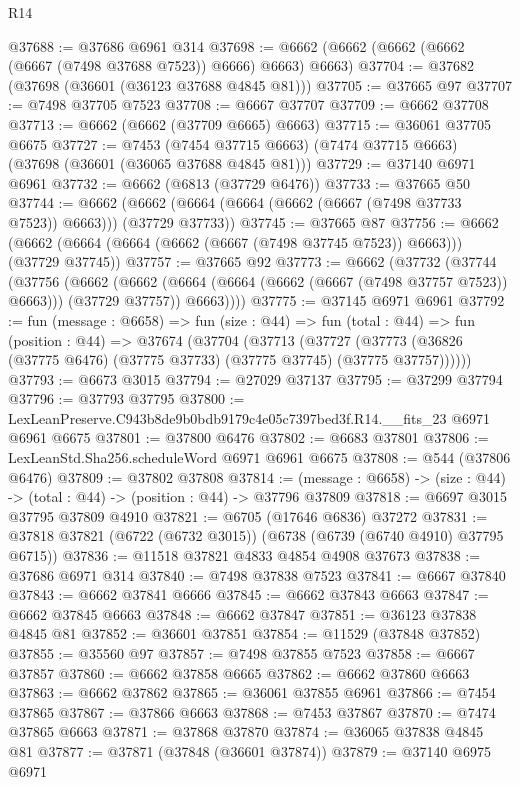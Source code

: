 \begin{lexlean}{R14}
\begin{coremodule}
@37688 := @37686 @6961 @314
@37698 := @6662 (@6662 (@6662 (@6662 (@6667 (@7498 @37688 @7523)) @6666) @6663) @6663)
@37704 := @37682 (@37698 (@36601 (@36123 @37688 @4845 @81)))
@37705 := @37665 @97
@37707 := @7498 @37705 @7523
@37708 := @6667 @37707
@37709 := @6662 @37708
@37713 := @6662 (@6662 (@37709 @6665) @6663)
@37715 := @36061 @37705 @6675
@37727 := @7453
    (@7454 @37715 @6663)
    (@7474 @37715 @6663)
    (@37698 (@36601 (@36065 @37688 @4845 @81)))
@37729 := @37140 @6971 @6961
@37732 := @6662 (@6813 (@37729 @6476))
@37733 := @37665 @50
@37744 := @6662 (@6662 (@6664 (@6664 (@6662 (@6667 (@7498 @37733 @7523)) @6663))) (@37729 @37733))
@37745 := @37665 @87
@37756 := @6662 (@6662 (@6664 (@6664 (@6662 (@6667 (@7498 @37745 @7523)) @6663))) (@37729 @37745))
@37757 := @37665 @92
@37773 := @6662
    (@37732
      (@37744
        (@37756
          (@6662
            (@6662 (@6664 (@6664 (@6662 (@6667 (@7498 @37757 @7523)) @6663))) (@37729 @37757))
            @6663))))
@37775 := @37145 @6971 @6961
@37792 := fun (message : @6658) =>
  fun (size : @44) =>
  fun (total : @44) =>
  fun (position : @44) =>
  @37674
    (@37704
      (@37713
        (@37727 (@37773 (@36826 (@37775 @6476) (@37775 @37733) (@37775 @37745) (@37775 @37757))))))
@37793 := @6673 @3015
@37794 := @27029 @37137
@37795 := @37299 @37794
@37796 := @37793 @37795
@37800 := LexLeanPreserve.C943b8de9b0bdb9179c4e05c7397bed3f.R14.__fits_23 @6971 @6961 @6675
@37801 := @37800 @6476
@37802 := @6683 @37801
@37806 := LexLeanStd.Sha256.scheduleWord @6971 @6961 @6675
@37808 := @544 (@37806 @6476)
@37809 := @37802 @37808
@37814 := (message : @6658) -> (size : @44) -> (total : @44) -> (position : @44) -> @37796 @37809
@37818 := @6697 @3015 @37795 @37809 @4910
@37821 := @6705 (@17646 @6836) @37272
@37831 := @37818 @37821 (@6722 (@6732 @3015)) (@6738 (@6739 (@6740 @4910) @37795 @6715))
@37836 := @11518 @37821 @4833 @4854 @4908 @37673
@37838 := @37686 @6971 @314
@37840 := @7498 @37838 @7523
@37841 := @6667 @37840
@37843 := @6662 @37841 @6666
@37845 := @6662 @37843 @6663
@37847 := @6662 @37845 @6663
@37848 := @6662 @37847
@37851 := @36123 @37838 @4845 @81
@37852 := @36601 @37851
@37854 := @11529 (@37848 @37852)
@37855 := @35560 @97
@37857 := @7498 @37855 @7523
@37858 := @6667 @37857
@37860 := @6662 @37858 @6665
@37862 := @6662 @37860 @6663
@37863 := @6662 @37862
@37865 := @36061 @37855 @6961
@37866 := @7454 @37865
@37867 := @37866 @6663
@37868 := @7453 @37867
@37870 := @7474 @37865 @6663
@37871 := @37868 @37870
@37874 := @36065 @37838 @4845 @81
@37877 := @37871 (@37848 (@36601 @37874))
@37879 := @37140 @6975 @6971

\end{coremodule}
\end{lexlean}
